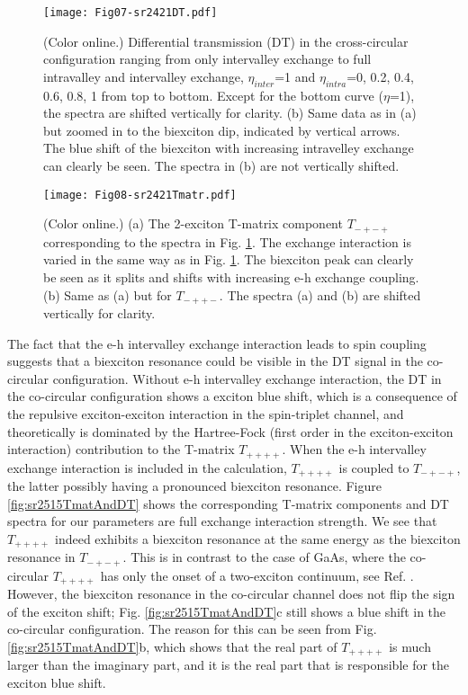 \documentclass[aps,prb,superscriptaddress,letterpaper,amsmath,amssymb,twocolumn,preprintnumbers]{revtex4}
\begin{document}
\begin{figure}
	\centering
	\texttt{[image: Fig07-sr2421DT.pdf]}
	\caption{
		(Color online.)
		Differential transmission (DT) in the cross-circular configuration ranging from only intervalley exchange  to full
intravalley and intervalley exchange, $\eta_{inter}$=1 and  $\eta_{intra}$=0, 0.2, 0.4, 0.6, 0.8, 1 from top to bottom. Except for the bottom curve ($\eta$=1), the spectra are shifted vertically
for clarity.
(b) Same data as in (a) but zoomed in to the biexciton dip, indicated by vertical arrows. The blue shift of the biexciton with increasing intravelley exchange can clearly be seen.
The spectra in (b) are not vertically shifted.
 }	
	\label{fig:sr2421DT}
\end{figure}






\begin{figure}
	\centering
	\texttt{[image: Fig08-sr2421Tmatr.pdf]}
	\caption{
		(Color online.)
		(a) The 2-exciton T-matrix component   $T_{-+-+}$ corresponding to the spectra in Fig. \protect\ref{fig:sr2421DT}. The exchange interaction is varied in the
same way as in  Fig. \protect\ref{fig:sr2421DT}. The biexciton peak can clearly be seen as it splits and shifts with increasing e-h exchange coupling.
(b) Same as (a) but for  $T_{-++-}$. The spectra (a) and (b) are  shifted vertically for clarity.	 }	
	\label{fig:sr2421Tmatr}
\end{figure}




The fact that the e-h intervalley exchange interaction leads to spin coupling suggests that a biexciton resonance could be visible in the DT signal in the co-circular configuration. Without e-h intervalley exchange interaction, the DT in the co-circular configuration shows a exciton blue shift, which is a consequence of the repulsive exciton-exciton interaction in the spin-triplet channel, and theoretically is dominated by the Hartree-Fock (first order in the exciton-exciton interaction) contribution to the T-matrix $T_{++++}$. When the e-h intervalley exchange interaction is included in the calculation,
$T_{++++}$  is coupled to $T_{-+-+}$, the latter possibly having a pronounced biexciton resonance. Figure \ref{fig:sr2515TmatAndDT} shows the corresponding T-matrix components and DT spectra for our parameters are full exchange interaction strength. We see that $T_{++++}$ indeed exhibits a biexciton resonance at the same energy as the biexciton resonance in $T_{-+-+}$. This is in contrast to the case of GaAs, where the co-circular $T_{++++}$ has only the onset of a two-exciton continuum, see Ref. . However, the biexciton resonance in the co-circular channel does not flip the sign of the exciton shift; Fig. \ref{fig:sr2515TmatAndDT}c still shows a blue shift in the co-circular configuration. The reason for this can be seen from  Fig. \ref{fig:sr2515TmatAndDT}b, which shows that the real part of $T_{++++}$ is much larger than the imaginary part, and it is the real part that is responsible for the exciton blue shift.
\end{document}
